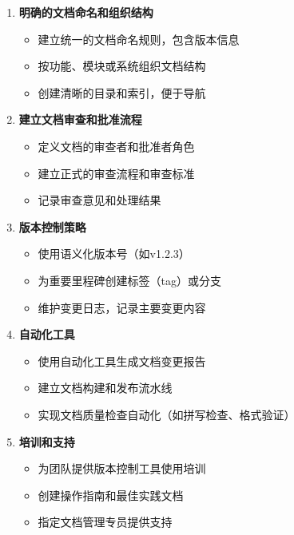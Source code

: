 \begin{enumerate}
\def\labelenumi{\arabic{enumi}.}
\tightlist
\item
  \textbf{明确的文档命名和组织结构}

  \begin{itemize}
  \tightlist
  \item
    建立统一的文档命名规则，包含版本信息
  \item
    按功能、模块或系统组织文档结构
  \item
    创建清晰的目录和索引，便于导航
  \end{itemize}
\item
  \textbf{建立文档审查和批准流程}

  \begin{itemize}
  \tightlist
  \item
    定义文档的审查者和批准者角色
  \item
    建立正式的审查流程和审查标准
  \item
    记录审查意见和处理结果
  \end{itemize}
\item
  \textbf{版本控制策略}

  \begin{itemize}
  \tightlist
  \item
    使用语义化版本号（如v1.2.3）
  \item
    为重要里程碑创建标签（tag）或分支
  \item
    维护变更日志，记录主要变更内容
  \end{itemize}
\item
  \textbf{自动化工具}

  \begin{itemize}
  \tightlist
  \item
    使用自动化工具生成文档变更报告
  \item
    建立文档构建和发布流水线
  \item
    实现文档质量检查自动化（如拼写检查、格式验证）
  \end{itemize}
\item
  \textbf{培训和支持}

  \begin{itemize}
  \tightlist
  \item
    为团队提供版本控制工具使用培训
  \item
    创建操作指南和最佳实践文档
  \item
    指定文档管理专员提供支持
  \end{itemize}
\end{enumerate}

